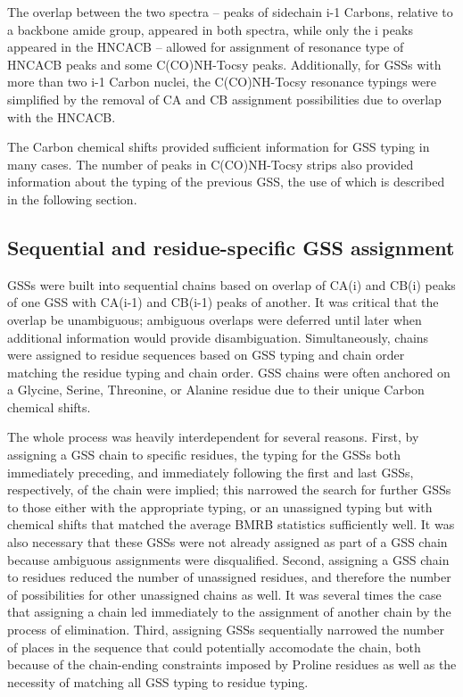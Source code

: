 The overlap between the two spectra -- peaks of sidechain i-1 Carbons, relative
to a backbone amide group, appeared in both spectra, while only the i peaks
appeared in the HNCACB -- allowed for assignment of resonance type of HNCACB
peaks and some C(CO)NH-Tocsy peaks.  Additionally, for GSSs with more than two
i-1 Carbon nuclei, the C(CO)NH-Tocsy resonance typings were simplified by the
removal of CA and CB assignment possibilities due to overlap with the HNCACB.

The Carbon chemical shifts provided sufficient information for GSS typing
in many cases.  The number of peaks in C(CO)NH-Tocsy strips also provided 
information about the typing of the previous GSS, the use of which is described
in the following section.

\subsection*{Sequential and residue-specific GSS assignment}
GSSs were built into sequential chains based on overlap of CA(i) and CB(i) 
peaks of one GSS with CA(i-1) and CB(i-1) peaks of another.  It was critical
that the overlap be unambiguous; ambiguous overlaps were deferred until later
when additional information would provide disambiguation.
Simultaneously, chains were assigned to residue sequences based on GSS typing
and chain order matching the residue typing and chain order.  GSS chains
were often anchored on a Glycine, Serine, Threonine, or Alanine residue due
to their unique Carbon chemical shifts.

The whole process was heavily interdependent for several reasons.  First, by
assigning a GSS chain to specific residues, the typing for the GSSs both
immediately preceding, and immediately following the first and last GSSs,
respectively, of the chain were implied; this narrowed the search for further
GSSs to those either with the appropriate typing, or an unassigned typing but
with chemical shifts that matched the average BMRB statistics sufficiently 
well.  It was also necessary that these GSSs were not already assigned as 
part of a GSS chain because ambiguous assignments were disqualified.
Second, assigning a GSS chain to residues reduced the number of unassigned
residues, and therefore the number of possibilities for other unassigned chains
as well.  It was several times the case that assigning a chain led immediately
to the assignment of another chain by the process of elimination.  Third,
assigning GSSs sequentially narrowed the number of places in the sequence that
could potentially accomodate the chain, both because of the chain-ending
constraints imposed by Proline residues as well as the necessity of matching
all GSS typing to residue typing.

